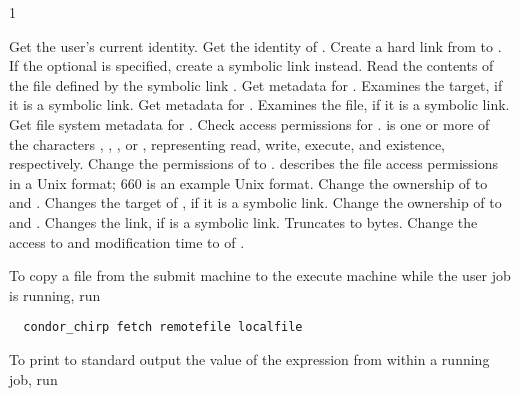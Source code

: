 \begin{ManPage}{\label{man-condor-chirp}}{1}
\begin{description}
    {Get the user's current identity.}
    {Get the identity of .}
    {Create a hard link from  to . 
    If the optional  is specified, create a symbolic link instead.}
    {Read the contents of the file defined by the symbolic link 
    .}
    {Get metadata for . Examines the target, 
    if it is a symbolic link.}
    {Get metadata for . Examines the file,
    if it is a symbolic link.}
    {Get file system metadata for .}
    {Check access permissions for . 
     is one or more of the characters , , 
    , or , representing read, write, execute, and 
    existence, respectively.}
    {Change the permissions of  to .
     describes the file access permissions in a Unix format;
    660 is an example Unix format. }
    {Change the ownership of  to  and .
    Changes the target of , if it is a symbolic link.}
    {Change the ownership of  to  and .
    Changes the link, if  is a symbolic link.}
    {Truncates  to  bytes.}
    {Change the access to  and modification time
    to  of .}
\end{description}

\Examples

To copy a file from the submit machine to the execute machine while the 
user job is running, run

\footnotesize
\begin{verbatim}
  condor_chirp fetch remotefile localfile
\end{verbatim}
\normalsize

To print to standard output the value of the 
expression from within a running job, run


\end{ManPage}
